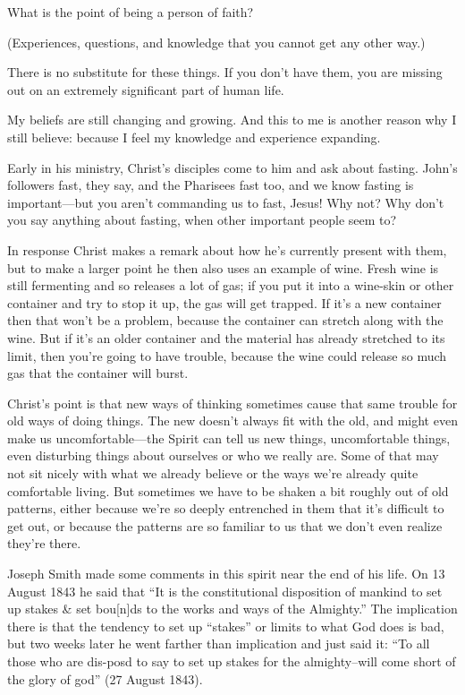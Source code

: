 \begin{compactitem}
			\item What is the point of being a person of faith? 
				\begin{compactitem}
					\item (Experiences, questions, and knowledge that you cannot get any other way.)
					\item There is no substitute for these things. If you don't have them, you are missing out on an extremely significant part of human life.
				\end{compactitem}
			
			\item My beliefs are still changing and growing. And this to me is another reason why I still believe: because I feel my knowledge and experience expanding.
				\begin{compactitem}
					\item Early in his ministry, Christ’s disciples come to him and ask about fasting. John’s followers fast, they say, and the Pharisees fast too, and we know fasting is important---but you aren’t commanding us to fast, Jesus! Why not? Why don’t you say anything about fasting, when other important people seem to?
					\item In response Christ makes a remark about how he’s currently present with them, but to make a larger point he then also uses an example of wine. Fresh wine is still fermenting and so releases a lot of gas; if you put it into a wine-skin or other container and try to stop it up, the gas will get trapped. If it’s a new container then that won’t be a problem, because the container can stretch along with the wine. But if it’s an older container and the material has already stretched to its limit, then you’re going to have trouble, because the wine could release so much gas that the container will burst.
					\item Christ’s point is that new ways of thinking sometimes cause that same trouble for old ways of doing things. The new doesn’t always fit with the old, and might even make us uncomfortable---the Spirit can tell us new things, uncomfortable things, even disturbing things about ourselves or who we really are. Some of that may not sit nicely with what we already believe or the ways we’re already quite comfortable living. But sometimes we have to be shaken a bit roughly out of old patterns, either because we’re so deeply entrenched in them that it’s difficult to get out, or because the patterns are so familiar to us that we don’t even realize they’re there.
					\item Joseph Smith made some comments in this spirit near the end of his life. On 13 August 1843 he said that ``It is the constitutional disposition of mankind to set up stakes \& set bou[n]ds to the works and ways of the Almighty.'' The implication there is that the tendency to set up ``stakes'' or limits to what God does is bad, but two weeks later he went farther than implication and just said it: ``To all those who are dis-posd to say to set up stakes for the almighty--will come short of the glory of god'' (27 August 1843).

\end{compactitem}
\end{compactitem}
